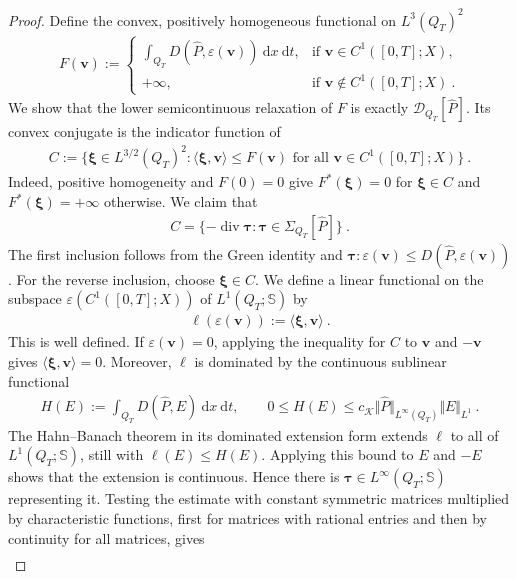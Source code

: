 \documentclass{article}
\theoremstyle{definition}
\newcommand{\bfv}{\boldsymbol{v}}
\newcommand{\bftau}{\boldsymbol{\tau}}
\newcommand{\bfxi}{\boldsymbol{\xi}}
\newcommand{\K}{\mathcal{K}}
\newcommand{\D}{\mathcal{D}}
\newcommand{\dd}{\:\mathrm{d}}
\renewcommand\div{\operatorname{\mathrm{div}}}
\begin{document}
\begin{proof}
Define the convex, positively homogeneous functional on $L^3(Q_T)^2$
\begin{align*}
     F(\bfv):=
 \begin{cases}
  \displaystyle\int_{Q_T} D(\hat P,\varepsilon(\bfv))\dd x\dd t,&\text{if }\bfv\in C^1([0,T];X),\\
  +\infty,&\text{if }\bfv\notin C^1([0,T];X) \ .
 \end{cases}
\end{align*}
We show that the lower semicontinuous relaxation of $F$ is exactly
$\D_{Q_T}[\hat P]$.
Its convex conjugate is the indicator function of
\begin{align*}
 C:=\{\bfxi\in L^{3/2}(Q_T)^2: \langle\bfxi,\bfv\rangle\leq F(\bfv)
                         \text{ for all }\bfv\in C^1([0,T];X)\} \ .
\end{align*}
Indeed, positive homogeneity and $F(0)=0$ give $F^*(\bfxi)=0$
for $\bfxi\in C$ and $F^*(\bfxi)=+\infty$ otherwise. We claim that
\begin{align}\label{eq:wu-polar}
 C=\{-\div\bftau:\bftau\in\Sigma_{Q_T}[\hat P]\} \ .
\end{align}
The first inclusion follows from the Green identity and
$\bftau:\varepsilon(\bfv)\leq D(\hat P,\varepsilon(\bfv))$.
For the reverse inclusion, choose $\bfxi\in C$. We define a linear functional
on the subspace $\varepsilon(C^1([0,T];X))$ of $L^1(Q_T;\mathbb S)$ by
\begin{align*}
    \ell(\varepsilon(\bfv)):=\langle\bfxi,\bfv\rangle \ .
\end{align*}
This is well defined. If $\varepsilon(\bfv)=0$, applying the inequality for
$C$ to $\bfv$ and $-\bfv$ gives $\langle\bfxi,\bfv\rangle=0$. Moreover, $\ell$ is
dominated by the continuous sublinear functional
\begin{align*}
     H(E):=\int_{Q_T} D(\hat P,E)\dd x\dd t,
 \qquad 0\leq H(E)\leq c_\K\Vert\hat P\Vert_{L^\infty(Q_T)}\Vert E\Vert_{L^1} \ .
\end{align*}
The Hahn--Banach theorem in its dominated extension form
\cite[Theorem 1.1]{Br11} extends $\ell$ to all of
$L^1(Q_T;\mathbb S)$, still with $\ell(E)\leq H(E)$. Applying this bound to
$E$ and $-E$ shows that the extension is continuous. Hence there is
$\bftau\in L^\infty(Q_T;\mathbb S)$ representing it. Testing the estimate
with constant symmetric matrices multiplied by characteristic functions,
first for matrices with rational entries and then by continuity for all
matrices, gives
\begin{align*}

\end{align*}
\end{proof}
\end{document}
